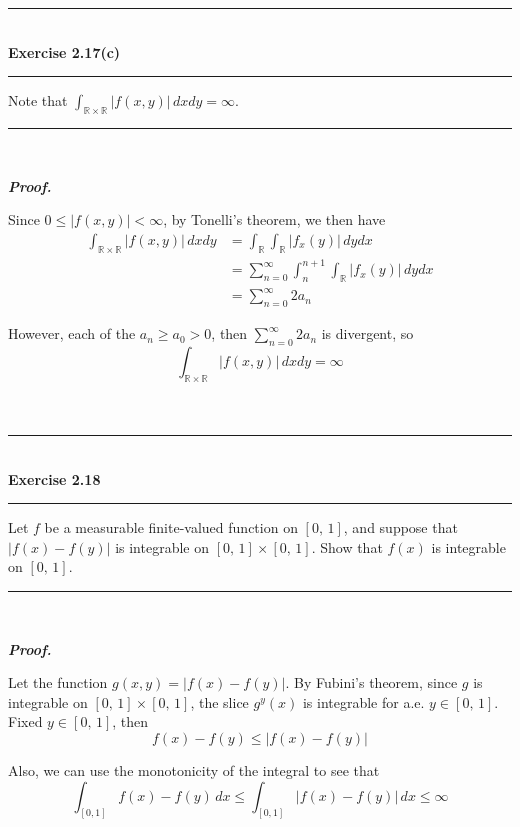 \documentclass[a4paper,11pt]{article}
\begin{document}

\begin{flushleft}
	\rule[-0.5ex]{17cm}{2pt}\\
		\textbf{Exercise 2.17(c)}\\
	\rule[1.5ex]{17cm}{0.5pt}
		Note that $\int_{\mathbb{R} \times \mathbb{R}} |f(x,y)|\,dxdy = \infty$.
	\rule[1.0ex]{17cm}{0.5pt}\
\end{flushleft}

\textbf{\textit{Proof.}}

Since $0 \leq |f(x,y)| < \infty$, by Tonelli's theorem, we then have
	$$\begin{aligned}
	\int_{\mathbb{R} \times \mathbb{R}} |f(x,y)|\,dxdy
	&= \int_{\mathbb{R}} \int_\mathbb{R} |f_x(y)|\,dydx\\
	&= \sum_{n = 0}^{\infty}\int_{n}^{n+1}\int_\mathbb{R} |f_x(y)|\,dydx\\
	&= \sum_{n = 0}^{\infty}2a_n
	\end{aligned}$$

However, each of the $a_n \geq a_0 > 0$, then $\sum_{n = 0}^{\infty}2a_n$ is divergent, so
	$$\int_{\mathbb{R} \times \mathbb{R}} |f(x,y)|\,dxdy = \infty$$\\\\




\begin{flushleft}
	\rule[-0.5ex]{17cm}{2pt}\\
		\textbf{Exercise 2.18}\\
	\rule[1.5ex]{17cm}{0.5pt}
		Let $f$ be a measurable finite-valued function on $[0,\,1]$, and suppose that $|f(x) - f(y)|$ is integrable on $[0,\,1] \times [0,\,1]$. Show that $f(x)$ is integrable on $[0,\,1]$.
	\rule[1.0ex]{17cm}{0.5pt}\
\end{flushleft}

\textbf{\textit{Proof.}}

Let the function $g(x,y) = |f(x) - f(y)|$. By Fubini's theorem, since $g$ is integrable on $[0,\,1] \times [0,\,1]$, the slice $g^y(x)$ is integrable for a.e. $y \in [0,\,1]$. Fixed $y \in [0,\,1]$, then
	$$f(x) - f(y) \leq |f(x) - f(y)|$$

Also, we can use the monotonicity of the integral to see that
	$$\int_{[0,1]} f(x) - f(y)\,dx
	\leq \int_{[0,1]} |f(x) - f(y)|\,dx
	\leq \infty$$
\end{document}
